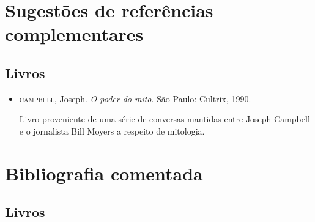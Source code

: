 \documentclass[11pt]{extarticle}
\begin{document}
\section{Sugestões de referências complementares}

\subsection{Livros} 

\begin{itemize}
\item \textsc{campbell}, Joseph. \textit{O poder do mito}. São Paulo: Cultrix, 1990.

Livro proveniente de uma série de conversas mantidas entre Joseph Campbell e o jornalista Bill Moyers a respeito de mitologia.
\end{itemize}

\section{Bibliografia comentada}
\subsection{Livros}
\end{document}
